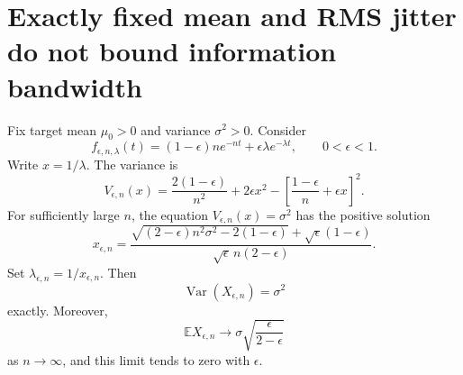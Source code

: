 \documentclass[aps,prapplied,preprint,nofootinbib]{revtex4-2}
\begin{document}
\section{Exactly fixed mean and RMS jitter do not bound information bandwidth}

Fix target mean $\mu_0>0$ and variance $\sigma^2>0$. Consider
\begin{equation}
f_{\epsilon,n,\lambda}(t)
=(1-\epsilon)ne^{-nt}
+\epsilon\lambda e^{-\lambda t},
\qquad 0<\epsilon<1.
\end{equation}
Write $x=1/\lambda$. The variance is
\begin{equation}
V_{\epsilon,n}(x)
=\frac{2(1-\epsilon)}{n^2}+2\epsilon x^2
-\left[\frac{1-\epsilon}{n}+\epsilon x\right]^2.
\end{equation}
For sufficiently large $n$, the equation $V_{\epsilon,n}(x)=\sigma^2$ has the positive solution
\begin{equation}
\boxed{
x_{\epsilon,n}
=\frac{
\sqrt{(2-\epsilon)n^2\sigma^2-2(1-\epsilon)}
+\sqrt\epsilon(1-\epsilon)
}{
\sqrt\epsilon\,n(2-\epsilon)
}.}
\label{eq:exactx}
\end{equation}
Set $\lambda_{\epsilon,n}=1/x_{\epsilon,n}$. Then
\begin{equation}
\operatorname{Var}(X_{\epsilon,n})=\sigma^2
\end{equation}
exactly. Moreover,
\begin{equation}
\mathbb E X_{\epsilon,n}\to
\sigma\sqrt{\frac{\epsilon}{2-\epsilon}}
\end{equation}
as $n\to\infty$, and this limit tends to zero with $\epsilon$.
\end{document}
